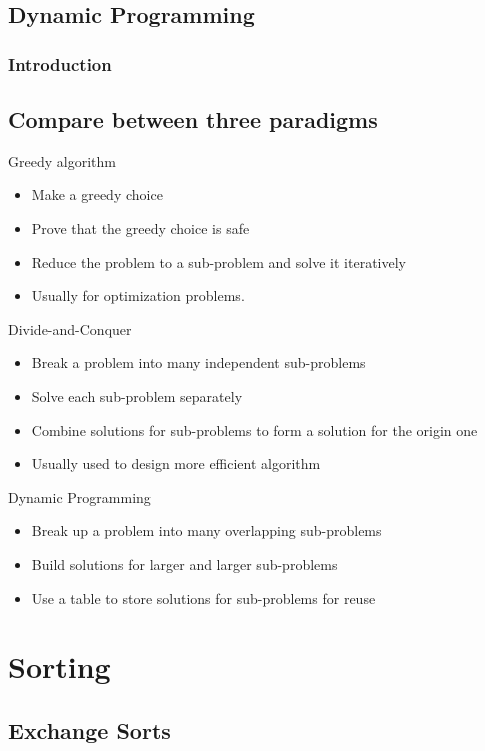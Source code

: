 		\section{Dynamic Programming}
			\subsection{Introduction}


		\section{Compare between three paradigms}
			Greedy algorithm
			\begin{itemize}
				\item Make a greedy choice
				\item Prove that the greedy choice is safe
				\item Reduce the problem to a sub-problem and solve it iteratively
				\item Usually for optimization problems.
			\end{itemize}

			Divide-and-Conquer
			\begin{itemize}
				\item Break a problem into many independent sub-problems
				\item Solve each sub-problem separately
				\item Combine solutions for sub-problems to form a solution for the origin one
				\item Usually used to design more efficient algorithm
			\end{itemize}

			Dynamic Programming
			\begin{itemize}
				\item Break up a problem into many overlapping sub-problems
				\item Build solutions for larger and larger sub-problems
				\item Use a table to store solutions for sub-problems for reuse
			\end{itemize}

	\chapter{Sorting}
		\section{Exchange Sorts}
